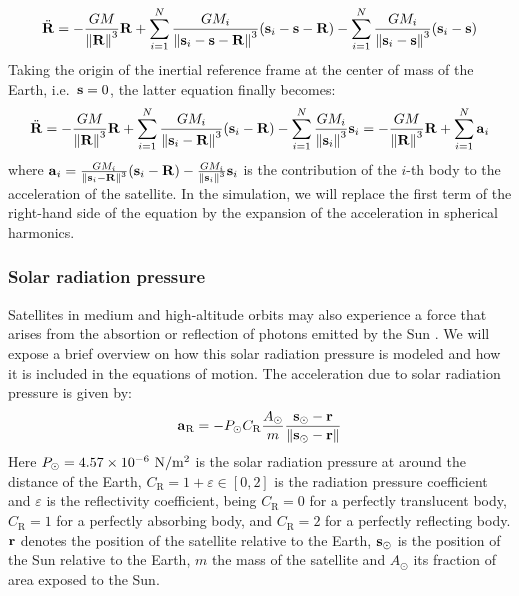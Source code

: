 \documentclass[../main.tex]{subfiles}
\begin{document}
\begin{equation}
  \ddot{\boldsymbol{\mathrm{R}}}=-\frac{GM}{\left\|\boldsymbol{\mathrm{R}}\right\|^3}\boldsymbol{\mathrm{R}}+\sum_{i=1}^N\frac{GM_i}{\left\|\boldsymbol{\mathrm{s}}_i-\boldsymbol{\mathrm{s}}-\boldsymbol{\mathrm{R}}\right\|^3}(\boldsymbol{\mathrm{s}}_i-\boldsymbol{\mathrm{s}}-\boldsymbol{\mathrm{R}})-\sum_{i=1}^N\frac{GM_i}{\left\|\boldsymbol{\mathrm{s}}_i-\boldsymbol{\mathrm{s}}\right\|^3}(\boldsymbol{\mathrm{s}}_i-\boldsymbol{\mathrm{s}})
\end{equation}
Taking the origin of the inertial reference frame at the center of mass of the Earth, i.e.\ $\boldsymbol{\mathrm{s}}=0$, the latter equation finally becomes:
\begin{equation}
  \ddot{\boldsymbol{\mathrm{R}}}=-\frac{GM}{\left\|\boldsymbol{\mathrm{R}}\right\|^3}\boldsymbol{\mathrm{R}}+\sum_{i=1}^N\frac{GM_i}{\left\|\boldsymbol{\mathrm{s}}_i-\boldsymbol{\mathrm{R}}\right\|^3}(\boldsymbol{\mathrm{s}}_i-\boldsymbol{\mathrm{R}})-\sum_{i=1}^N\frac{GM_i}{\left\|\boldsymbol{\mathrm{s}}_i\right\|^3}\boldsymbol{\mathrm{s}}_i=-\frac{GM}{\left\|\boldsymbol{\mathrm{R}}\right\|^3}\boldsymbol{\mathrm{R}}+\sum_{i=1}^N\boldsymbol{\mathrm{a}}_i
\end{equation}
where $\boldsymbol{\mathrm{a}}_i=\frac{GM_i}{\left\|\boldsymbol{\mathrm{s}}_i-\boldsymbol{\mathrm{R}}\right\|^3}(\boldsymbol{\mathrm{s}}_i-\boldsymbol{\mathrm{R}})-\frac{GM_i}{\left\|\boldsymbol{\mathrm{s}}_i\right\|^3}\boldsymbol{\mathrm{s}}_i$ is the contribution of the $i$-th body to the acceleration of the satellite.
In the simulation, we will replace the first term of the right-hand side of the equation by the expansion of the acceleration in spherical harmonics.

\subsubsection{Solar radiation pressure}
Satellites in medium and high-altitude orbits may also experience a force that arises from the absortion or reflection of photons emitted by the Sun \cite{montenbruck}. We will expose a brief overview on how this solar radiation pressure is modeled and how it is included in the equations of motion. The acceleration due to solar radiation pressure is given by:
\begin{equation}\label{eq:preSolarRad}
  {\boldsymbol{\mathrm{a}}}_{\mathrm{R}}=-P_{\odot} C_{\mathrm{R}} \frac{A_\odot}{m} \frac{\boldsymbol{\mathrm{s}}_\odot-\boldsymbol{\mathrm{r}}}{\left\|\boldsymbol{\mathrm{s}}_\odot-\boldsymbol{\mathrm{r}}\right\|}
\end{equation}
Here $P_{\odot}= 4.57\times 10^{-6}\ \mathrm{N} / \mathrm{m}^2$ is the solar radiation pressure at around the distance of the Earth, $C_{\mathrm{R}}=1+\varepsilon\in [0,2]$ is the radiation pressure coefficient and $\varepsilon$ is the reflectivity coefficient, being $C_{\mathrm{R}}=0$ for a perfectly translucent body, $C_{\mathrm{R}}=1$ for a perfectly absorbing body, and $C_{\mathrm{R}}=2$ for a perfectly reflecting body. $\boldsymbol{\mathrm{r}}$ denotes the position of the satellite relative to the Earth, $\boldsymbol{\mathrm{s}}_\odot$ is the position of the Sun relative to the Earth, $m$ the mass of the satellite and $A_\odot$ its fraction of area exposed to the Sun.
\end{document}
